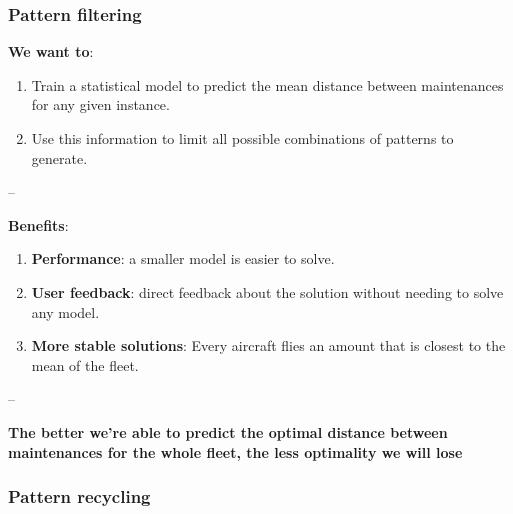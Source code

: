 \begin{frame}
\frametitle{\textbf{Pattern filtering}}


  \textbf{We want to}:

  \begin{enumerate}[<+->]

  \item
    Train a statistical model to predict the mean distance between
    maintenances for any given instance.
  \item
    Use this information to limit all possible combinations of patterns to
    generate.
  \end{enumerate}

  --

  \textbf{Benefits}:

  \begin{enumerate}[<+->]

  \item
    \textbf{Performance}: a smaller model is easier to solve.
  \item
    \textbf{User feedback}: direct feedback about the solution without
    needing to solve any model.
  \item
    \textbf{More stable solutions}: Every aircraft flies an amount that is
    closest to the mean of the fleet.
  \end{enumerate}

  --

  \textbf{The better we're able to predict the optimal distance between
  maintenances for the whole fleet, the less optimality we will lose}
\end{frame}

\begin{frame}
\frametitle{\textbf{Pattern recycling}}


\end{frame}


